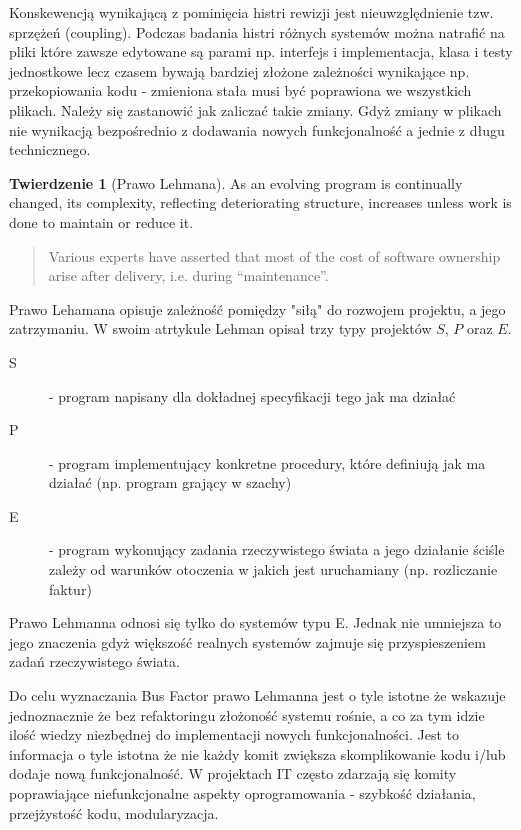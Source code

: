\documentclass[a4paper,11pt,twoside]{report}
\theoremstyle{definition}
\newtheorem{theorem}{Twierdzenie}[chapter]
\begin{document}
Konskewencją wynikającą z pominięcia histri rewizji jest nieuwzględnienie 
tzw. sprzężeń (coupling). Podczas badania histri różnych systemów można 
natrafić na pliki które zawsze edytowane są parami np. interfejs i 
implementacja, klasa i testy jednostkowe lecz czasem bywają bardziej złożone 
zależności wynikające np. przekopiowania kodu - zmieniona stała musi być 
poprawiona we wszystkich plikach. Należy się zastanowić jak zaliczać takie 
zmiany. Gdyż zmiany w plikach nie wynikacją bezpośrednio z dodawania nowych 
funkcjonalność a jednie z długu technicznego.

\begin{theorem}[Prawo Lehmana]
As an evolving program is continually changed, its complexity, reflecting 
deteriorating structure, increases unless work is done to maintain or reduce it.
\end{theorem}

\begin{quote}
Various experts have asserted that most of the cost of software ownership arise 
after delivery, i.e. during “maintenance”.
\end{quote}

Prawo Lehamana opisuje zależność pomiędzy "siłą" do rozwojem projektu, a 
jego zatrzymaniu. W swoim atrtykule Lehman opisał trzy typy projektów $S$, 
$P$ oraz $E$.
\begin{description}
\item[S] - program napisany dla dokładnej specyfikacji tego jak ma działać
\item[P] - program implementujący konkretne procedury, które definiują jak 
ma działać (np. program grający w szachy)
\item[E] - program wykonujący zadania rzeczywistego świata a jego działanie 
ściśle zależy od warunków otoczenia w jakich jest uruchamiany (np. 
rozliczanie faktur) 
\end{description}


Prawo Lehmanna odnosi się tylko do systemów typu E. Jednak nie umniejsza to 
jego znaczenia gdyż większość realnych systemów zajmuje się 
przyspieszeniem zadań rzeczywistego świata.

Do celu wyznaczania Bus Factor prawo Lehmanna jest o tyle istotne że wskazuje 
jednoznacznie że bez refaktoringu złożoność systemu rośnie, a co za tym 
idzie ilość wiedzy niezbędnej do implementacji nowych funkcjonalności. Jest 
to informacja o tyle istotna że nie każdy komit zwiększa skomplikowanie kodu 
i/lub dodaje nową funkcjonalność. W projektach IT często zdarzają się 
komity poprawiające niefunkcjonalne aspekty oprogramowania - szybkość 
działania, przejżystość kodu, modularyzacja. 
\end{document}
